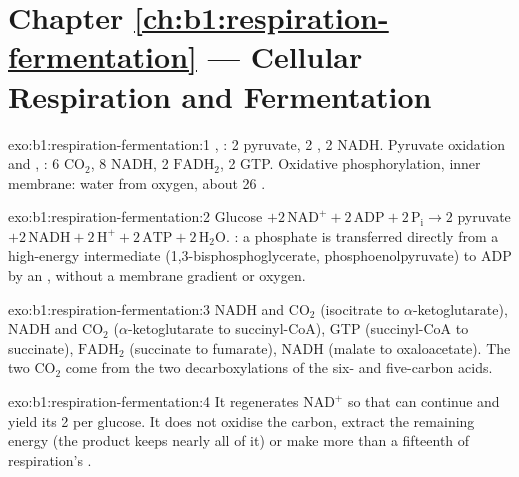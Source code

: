 \section*{Chapter \ref{ch:b1:respiration-fermentation} --- Cellular Respiration and Fermentation}

\begin{solution}{exo:b1:respiration-fermentation:1}
, : 2 pyruvate, 2 , 2 NADH. Pyruvate oxidation and
, : 6 $\mathrm{CO_2}$, 8 NADH, 2
$\mathrm{FADH_2}$, 2 GTP. Oxidative phosphorylation, inner membrane:
water from oxygen, about 26 .
\end{solution}

\begin{solution}{exo:b1:respiration-fermentation:2}
Glucose $+ 2\,\mathrm{NAD^+} + 2\,\mathrm{ADP} + 2\,\mathrm{P_i} \to
2$ pyruvate $+ 2\,\mathrm{NADH} + 2\,\mathrm{H^+} + 2\,\mathrm{ATP} +
2\,\mathrm{H_2O}$. : a phosphate is
transferred directly from a high-energy intermediate
(1,3-bisphosphoglycerate, phosphoenolpyruvate) to ADP by an ,
without a membrane gradient or oxygen.
\end{solution}

\begin{solution}{exo:b1:respiration-fermentation:3}
NADH and $\mathrm{CO_2}$ (isocitrate to $\alpha$-ketoglutarate), NADH
and $\mathrm{CO_2}$ ($\alpha$-ketoglutarate to succinyl-CoA), GTP
(succinyl-CoA to succinate), $\mathrm{FADH_2}$ (succinate to fumarate),
NADH (malate to oxaloacetate). The two $\mathrm{CO_2}$ come from the
two decarboxylations of the six- and five-carbon acids.
\end{solution}

\begin{solution}{exo:b1:respiration-fermentation:4}
It regenerates $\mathrm{NAD^+}$ so that  can continue and
yield its 2  per glucose. It does not oxidise the carbon, extract
the remaining energy (the product keeps nearly all of it) or make more
than a fifteenth of respiration's .
\end{solution}

